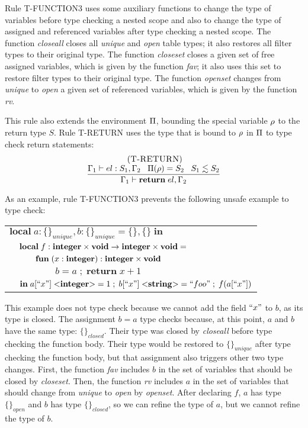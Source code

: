 Rule \textsc{T-FUNCTION3} uses some auxiliary functions to change
the type of variables before type checking a nested scope and
also to change the type of assigned and referenced variables after
type checking a nested scope.
The function \emph{closeall} closes all \emph{unique} and \emph{open}
table types; it also restores all filter types to their original type.
The function \emph{closeset} closes a given set of free assigned variables,
which is given by the function \emph{fav};
it also uses this set to restore filter types to their original type.
The function \emph{openset} changes from \emph{unique} to \emph{open}
a given set of referenced variables, which is given by the function \emph{rv}.

This rule also extends the environment $\Pi$, bounding the special
variable $\rho$ to the return type $S$.
Rule \textsc{T-RETURN} uses the type that is bound to $\rho$ in
$\Pi$ to type check return statements:
\[
\begin{array}{c}
\; (\textsc{T-RETURN})\\
\dfrac{\Gamma_{1} \vdash el:S_{1}, \Gamma_{2} \;\;\;
       \Pi(\rho) = S_{2} \;\;\;
       S_{1} \lesssim S_{2}}
      {\Gamma_{1} \vdash \mathbf{return} \; el, \Gamma_{2}}
\end{array}
\]

As an example, rule \textsc{T-FUNCTION3} prevents the following unsafe example to type check:
\begin{center}
\begin{tabular}{llll}
\multicolumn{4}{l}{$\mathbf{local} \; a:\{\}_{unique}, b:\{\}_{unique} = \{\}, \{\} \; \mathbf{in}$}\\
& \multicolumn{3}{l}{$\mathbf{local} \; f:\mathbf{integer} \times \mathbf{void} \rightarrow \mathbf{integer} \times \mathbf{void} =$}\\
& & \multicolumn{2}{l}{$\mathbf{fun} \; (x:\mathbf{integer}):\mathbf{integer} \times \mathbf{void}$}\\
& & & \multicolumn{1}{l}{$b = a \;;\; \mathbf{return} \; x + 1$}\\
& \multicolumn{3}{l}{$\mathbf{in} \; a[``x"] \; {<}\mathbf{integer}{>} = 1 \;;\; b[``x"] \; {<}\mathbf{string}{>} = ``foo" \;;\; f(a[``x"])$}
\end{tabular}
\end{center}

This example does not type check because we cannot add the field
$``x"$ to $b$, as its type is closed.
The assignment $b = a$ type checks because, at this point,
$a$ and $b$ have the same type: $\{\}_{closed}$.
Their type was closed by \emph{closeall} before type checking
the function body.
Their type would be restored to $\{\}_{unique}$ after type checking
the function body, but that assignment also triggers other two type changes.
First, the function \emph{fav} includes $b$ in the set of variables
that should be closed by \emph{closeset}.
Then, the function \emph{rv} includes $a$ in the set of variables
that should change from \emph{unique} to \emph{open} by \emph{openset}.
After declaring $f$, $a$ has type $\{\}_{open}$ and $b$ has type $\{\}_{closed}$,
so we can refine the type of $a$, but we cannot refine the type of $b$.

